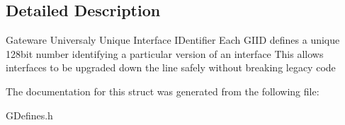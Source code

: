 \subsection{Detailed Description}
Gateware Universaly Unique Interface I\+Dentifier Each G\+I\+ID defines a unique 128bit number identifying a particular version of an interface This allows interfaces to be upgraded down the line safely without breaking legacy code 

The documentation for this struct was generated from the following file\+:\begin{DoxyCompactItemize}
\item 
G\+Defines.\+h\end{DoxyCompactItemize}
